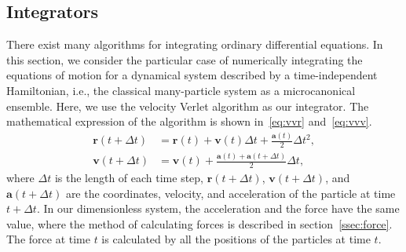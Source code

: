 \subsection{Integrators}

There exist many algorithms for integrating ordinary differential equations.
In this section, we consider the particular case of numerically integrating the equations of
motion for a dynamical system described by a time-independent Hamiltonian, i.e., the
classical many-particle system as a microcanonical ensemble.
Here, we use the velocity Verlet algorithm as our integrator.
The mathematical expression of the algorithm is shown in~\eqref{eq:vvr} and~\eqref{eq:vvv}.
%
\begin{align}
    \bm{r}(t + \Delta t) & = \bm{r}(t) + \bm{v}(t) \Delta t + \frac{ \bm{a}(t) }{ 2 } \Delta t^2,\label{eq:vvr} \\
    \bm{v}(t + \Delta t) & = \bm{v}(t) + \frac{ \bm{a}(t) + \bm{a}(t + \Delta t) }{ 2 } \Delta t,\label{eq:vvv}
\end{align}
%
where $\Delta t$ is the length of each time step, $\bm{r}(t + \Delta t)$,
$\bm{v}(t + \Delta t)$, and $\bm{a}(t + \Delta t)$
are the coordinates, velocity, and acceleration of the particle at time $t + \Delta t$.
In our dimensionless system, the acceleration and the force have the same value,
where the method of calculating forces is described in section~\ref{ssec:force}.
The force at time $t$ is calculated by all the positions of the particles at time $t$.

